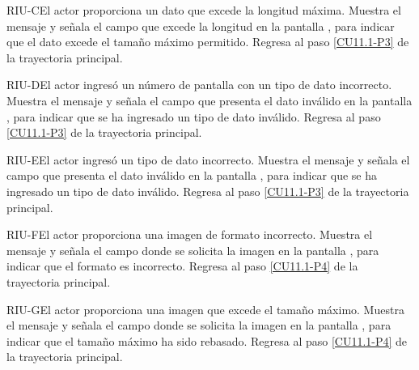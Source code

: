 	\begin{UCtrayectoriaA}{RIU-C}{El actor proporciona un dato que excede la longitud máxima.}
		\UCpaso[\UCsist] Muestra el mensaje  y señala el campo que excede la longitud en la pantalla , para indicar que el dato excede el tamaño máximo permitido.
		\UCpaso Regresa al paso \ref{CU11.1-P3} de la trayectoria principal.
	\end{UCtrayectoriaA}

	\begin{UCtrayectoriaA}{RIU-D}{El actor ingresó un número de pantalla con un tipo de dato incorrecto.}
		\UCpaso[\UCsist] Muestra el mensaje  y señala el campo que presenta el dato inválido en la pantalla , para indicar que se ha ingresado un tipo de dato inválido.
		\UCpaso Regresa al paso \ref{CU11.1-P3} de la trayectoria principal.
	\end{UCtrayectoriaA}
	
	\begin{UCtrayectoriaA}{RIU-E}{El actor ingresó un tipo de dato incorrecto.}
		\UCpaso[\UCsist] Muestra el mensaje  y señala el campo que presenta el dato inválido en la pantalla , para indicar que se ha ingresado un tipo de dato inválido.
		\UCpaso Regresa al paso \ref{CU11.1-P3} de la trayectoria principal.
	\end{UCtrayectoriaA}

	\begin{UCtrayectoriaA}{RIU-F}{El actor proporciona una imagen de formato incorrecto.}
		\UCpaso[\UCsist] Muestra el mensaje  y señala el campo donde se solicita la imagen en la pantalla , para indicar que el formato es incorrecto.
		\UCpaso Regresa al paso \ref{CU11.1-P4} de la trayectoria principal.
	\end{UCtrayectoriaA}

	\begin{UCtrayectoriaA}{RIU-G}{El actor proporciona una imagen que excede el tamaño máximo.}
		\UCpaso[\UCsist] Muestra el mensaje  y señala el campo donde se solicita la imagen en la pantalla , para indicar que el tamaño máximo ha sido rebasado.
		\UCpaso Regresa al paso \ref{CU11.1-P4} de la trayectoria principal.
	\end{UCtrayectoriaA}
	
